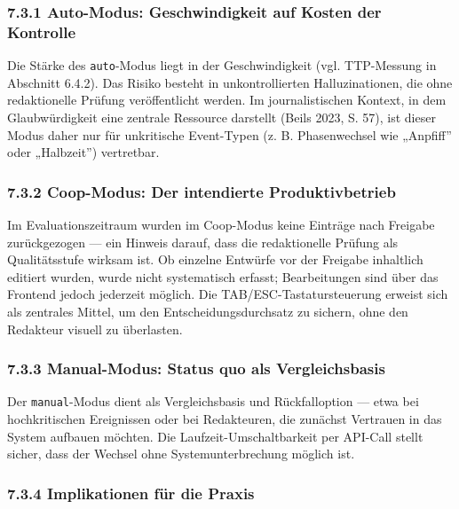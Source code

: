 \subsubsection{7.3.1 Auto-Modus: Geschwindigkeit auf Kosten der
Kontrolle}\label{auto-modus-geschwindigkeit-auf-kosten-der-kontrolle}

Die Stärke des \passthrough{\lstinline!auto!}-Modus liegt in der
Geschwindigkeit (vgl. TTP-Messung in Abschnitt 6.4.2). Das Risiko
besteht in unkontrollierten Halluzinationen, die ohne redaktionelle
Prüfung veröffentlicht werden. Im journalistischen Kontext, in dem
Glaubwürdigkeit eine zentrale Ressource darstellt (Beils 2023, S. 57),
ist dieser Modus daher nur für unkritische Event-Typen (z. B.
Phasenwechsel wie „Anpfiff'' oder „Halbzeit'') vertretbar.

\subsubsection{7.3.2 Coop-Modus: Der intendierte
Produktivbetrieb}\label{coop-modus-der-intendierte-produktivbetrieb}

Im Evaluationszeitraum wurden im Coop-Modus keine Einträge nach Freigabe
zurückgezogen --- ein Hinweis darauf, dass die redaktionelle Prüfung als
Qualitätsstufe wirksam ist. Ob einzelne Entwürfe vor der Freigabe
inhaltlich editiert wurden, wurde nicht systematisch erfasst;
Bearbeitungen sind über das Frontend jedoch jederzeit möglich. Die
TAB/ESC-Tastatursteuerung erweist sich als zentrales Mittel, um den
Entscheidungsdurchsatz zu sichern, ohne den Redakteur visuell zu
überlasten.

\subsubsection{7.3.3 Manual-Modus: Status quo als
Vergleichsbasis}\label{manual-modus-status-quo-als-vergleichsbasis}

Der \passthrough{\lstinline!manual!}-Modus dient als Vergleichsbasis und
Rückfalloption --- etwa bei hochkritischen Ereignissen oder bei
Redakteuren, die zunächst Vertrauen in das System aufbauen möchten. Die
Laufzeit-Umschaltbarkeit per API-Call stellt sicher, dass der Wechsel
ohne Systemunterbrechung möglich ist.

\subsubsection{7.3.4 Implikationen für die
Praxis}\label{implikationen-fuxfcr-die-praxis}

